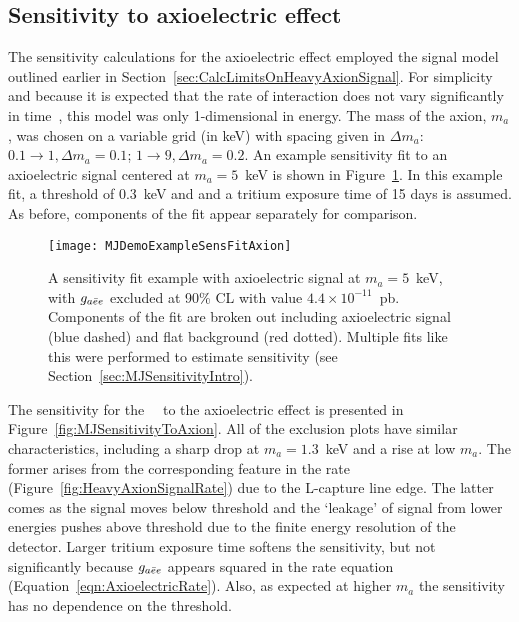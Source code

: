 		\subsection{Sensitivity to axioelectric effect}
		\label{sec:MJSensitivityToAxions}
		
	The sensitivity calculations for the axioelectric effect employed the signal model outlined earlier in Section~\ref{sec:CalcLimitsOnHeavyAxionSignal}.  For simplicity and because it is expected that the rate of interaction does not vary significantly in time~\cite{Pospelov:2008jk}, this model was only 1-dimensional in energy.  The mass of the axion, $m_{a}$, was chosen on a variable grid (in keV) with spacing given in $\Delta m_{a}$: $0.1\to1, \Delta m_{a} = 0.1$; $1\to9, \Delta m_{a} = 0.2$.  An example sensitivity fit to an axioelectric signal centered at $m_{a}=5$~keV is shown in Figure~\ref{fig:MJSensitivityToAxionExample}.  In this example fit, a threshold of 0.3~keV and and a tritium exposure time of 15 days is assumed.  As before, components of the fit appear separately for comparison.   
		
			\begin{figure}
				\centering
				\texttt{[image: MJDemoExampleSensFitAxion]}
				\caption[\MJ~\minmod~axioelectric sensitivity fit example]{A sensitivity fit example 
				with axioelectric signal at $m_{a}=5$~keV, with $g_{a\bar{e}e}$ excluded at 90\% CL with
				value
				 $4.4\times10^{-11}$~pb.  Components of the fit are broken out including axioelectric 
				 signal (blue dashed) and flat background (red dotted).  
				Multiple fits like this were performed to estimate sensitivity (see Section~\ref{sec:MJSensitivityIntro}).}
				\label{fig:MJSensitivityToAxionExample}
			\end{figure}
	
	The sensitivity for the \MJ~\minmod~to the axioelectric effect is presented in Figure~\ref{fig:MJSensitivityToAxion}.  All of the exclusion plots have similar characteristics, including a sharp drop at $m_{a}=1.3$~keV and a rise at low $m_{a}$.  The former arises from the corresponding feature in the rate (Figure~\ref{fig:HeavyAxionSignalRate}) due to the L-capture line edge.  The latter comes as the signal moves below threshold and the `leakage' of signal from lower energies pushes above threshold due to the finite energy resolution of the detector.  Larger tritium exposure time softens the sensitivity, but not significantly because $g_{a\bar{e}e}$ appears squared in the rate equation (Equation~\ref{eqn:AxioelectricRate}).  Also, as expected at higher $m_{a}$ the sensitivity has no dependence on the threshold.
	

